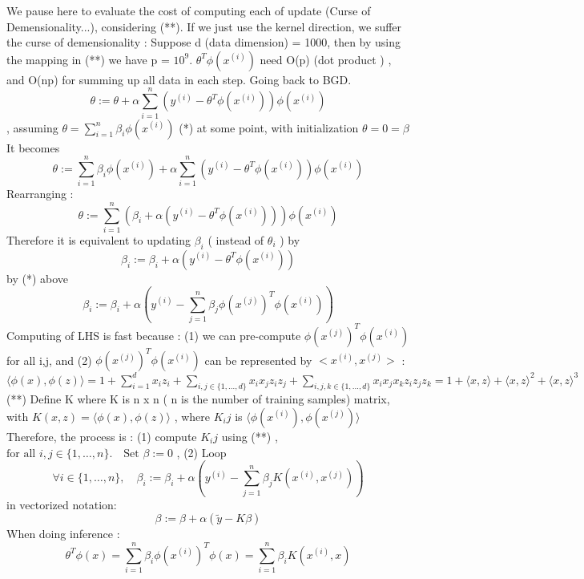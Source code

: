 \documentclass{article}
\begin{document}
We pause here to evaluate the cost of computing each of update (Curse of Demensionality...), considering (**). If we just use the kernel direction, we suffer the curse of demensionality : Suppose d (data dimension) = 1000, then by using the mapping in (**) we have p = \(10^9\). \(\theta^T\phi(x^{(i)})\) need O(p) (dot product ) , and O(np) for summing up all data in each step.
\newline
Going back to BGD.
\[\theta := \theta + \alpha \sum_{i=1}^{n} (y^{(i)} - \theta^T\phi(x^{(i)}))\phi(x^{(i)})\]
, assuming 
\(\theta = \sum_{i=1}^{n} \beta_i \phi(x^{(i)})\) (*) at some point, with initialization \(\theta = 0 = \beta \)
\newline 
It becomes 
\[\theta := \sum_{i=1}^{n} \beta_i \phi(x^{(i)}) + \alpha \sum_{i=1}^{n} (y^{(i)} - \theta^T\phi(x^{(i)}))\phi(x^{(i)})\] 
Rearranging : 
\[\theta := \sum_{i=1}^{n} (\beta_i + \alpha  (y^{(i)} - \theta^T\phi(x^{(i)})))\phi(x^{(i)})\] 
Therefore it is equivalent to updating \(\beta_i\) ( instead of \(\theta_i\) ) by 
\[\beta_i := \beta_i + \alpha  (y^{(i)} - \theta^T\phi(x^{(i)}))\]
by (*) above
\[ \beta_i := \beta_i + \alpha \left( y^{(i)} - \sum_{j=1}^{n} \beta_j \phi(x^{(j)})^T \phi(x^{(i)}) \right)\]
Computing of LHS is fast because : (1) we can pre-compute \( \phi(x^{(j)})^T \phi(x^{(i)})\) for all i,j, and (2) \( \phi(x^{(j)})^T \phi(x^{(i)})\) can be represented by \(<x^{(i)},x^{(j)}>\)  : 
\newline
\(\langle \phi(x), \phi(z) \rangle = 1 + \sum_{i=1}^{d} x_i z_i + \sum_{i,j \in \{1, \ldots, d\}} x_i x_j z_i z_j + \sum_{i,j,k \in \{1, \ldots, d\}} x_i x_j x_k z_i z_j z_k = 1 + \langle x, z \rangle + \langle x, z \rangle^2 + \langle x, z \rangle^3\) (**)
\newline 
\newline 
Define K where K is n x n ( n is the number of training samples) matrix, with \(K(x, z) = \langle \phi(x), \phi(z) \rangle\) , where \(K_ij\) is \(\langle \phi(x^{(i)}), \phi(x^{(j)}) \rangle\)
\newline\newline
Therefore, the process is : (1) compute \(K_ij\) using (**) , \(\text{for all } i, j \in \{1, \ldots, n\}. \quad \text{Set } \beta := 0\) ,
\newline
 (2) Loop
\[\forall i \in \{1, \ldots, n\}, \quad \beta_i := \beta_i + \alpha \left( y^{(i)} - \sum_{j=1}^{n} \beta_j K(x^{(i)}, x^{(j)}) \right)\] 
in vectorized notation: 
\[\beta := \beta + \alpha (\tilde{y} - K\beta)\]
When doing inference : 
\[\theta^T \phi(x) = \sum_{i=1}^{n} \beta_i \phi(x^{(i)})^T \phi(x) = \sum_{i=1}^{n} \beta_i K(x^{(i)}, x)\]
\end{document}
